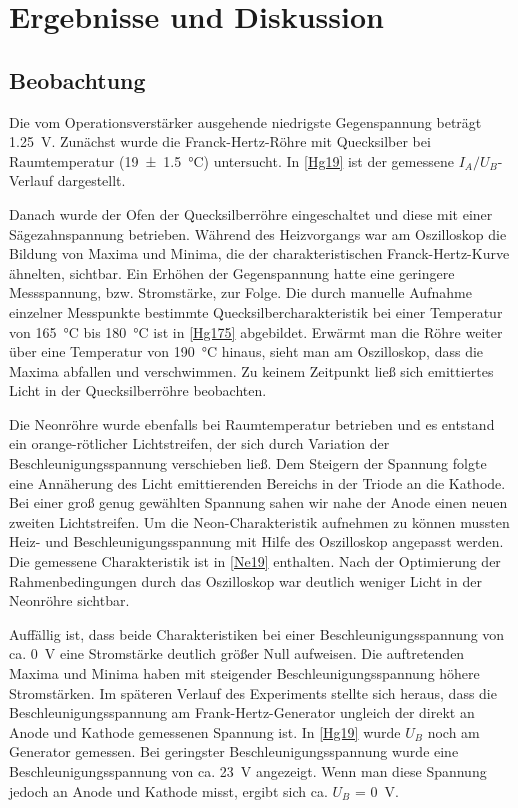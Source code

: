 \documentclass[
	a4paper,
	12pt,
	pagesize,
	ngerman
]{scrartcl}
\begin{document}
	\section{Ergebnisse und Diskussion}
	

	\subsection{Beobachtung}
	Die vom Operationsverstärker ausgehende niedrigste Gegenspannung beträgt \SI{1,25}{V}. Zunächst wurde die Franck-Hertz-Röhre mit Quecksilber bei Raumtemperatur (\SI{19 +- 1,5}{\degreeCelsius}) untersucht. In \cref{Hg19} ist der gemessene $I_A/U_B$-Verlauf dargestellt.
	
	Danach wurde der Ofen der Quecksilberröhre eingeschaltet und diese mit einer Sägezahnspannung betrieben. %
	Während des Heizvorgangs war am Oszilloskop die Bildung von Maxima und Minima, die der charakteristischen Franck-Hertz-Kurve ähnelten, sichtbar. %
	Ein Erhöhen der Gegenspannung hatte eine geringere Messspannung, bzw. Stromstärke, zur Folge.
	Die durch manuelle Aufnahme einzelner Messpunkte bestimmte Quecksilbercharakteristik bei einer Temperatur von \SI{165}{\degreeCelsius} bis \SI{180}{\degreeCelsius} ist in \cref{Hg175} abgebildet.
	Erwärmt man die Röhre weiter über eine Temperatur von \SI{190}{\degreeCelsius} hinaus, sieht man am Oszilloskop, dass die Maxima abfallen und verschwimmen.
	Zu keinem Zeitpunkt ließ sich emittiertes Licht in der Quecksilberröhre beobachten.
	
	Die Neonröhre wurde ebenfalls bei Raumtemperatur betrieben und es entstand ein orange-rötlicher Lichtstreifen, der sich durch Variation der Beschleunigungsspannung verschieben ließ. 
	Dem Steigern der Spannung folgte eine Annäherung des Licht emittierenden Bereichs in der Triode an die Kathode.
	Bei einer groß genug gewählten Spannung sahen wir nahe der Anode einen neuen zweiten Lichtstreifen.
	Um die Neon-Charakteristik aufnehmen zu können mussten Heiz- und Beschleunigungsspannung mit Hilfe des Oszilloskop angepasst werden.
	Die gemessene Charakteristik ist in \cref{Ne19} enthalten. Nach der Optimierung der Rahmenbedingungen durch das Oszilloskop war deutlich weniger Licht in der Neonröhre sichtbar.
	
	Auffällig ist, dass beide Charakteristiken bei einer Beschleunigungsspannung von ca. \SI{0}{V} eine Stromstärke deutlich größer Null aufweisen. 
	Die auftretenden Maxima und Minima haben mit steigender Beschleunigungsspannung höhere Stromstärken.
	Im späteren Verlauf des Experiments stellte sich heraus, dass die Beschleunigungsspannung am Frank-Hertz-Generator ungleich der direkt an Anode und Kathode gemessenen Spannung ist.
	In \cref{Hg19} wurde $U_B$ noch am Generator gemessen.
	Bei geringster Beschleunigungsspannung wurde eine Beschleunigungsspannung von ca. \SI{23}{V} angezeigt.
	Wenn man diese Spannung jedoch an Anode und Kathode misst, ergibt sich ca. $U_B$ = \SI{0}{V}.
	
\end{document}
